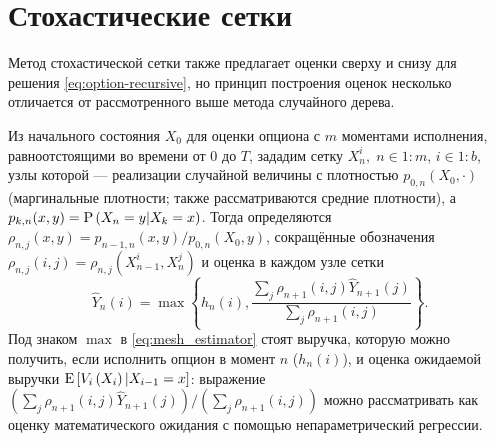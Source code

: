 



\section{Стохастические сетки} %
\label{sec:classic_approaches:mesh_estimator}

Метод стохастической сетки \cite{Broadie2004,Kashtanov2015} также предлагает оценки сверху и снизу для решения \eqref{eq:option-recursive}, но принцип построения оценок несколько отличается от рассмотренного выше метода случайного дерева.

Из начального состояния $X_0$ для оценки опциона с $m$ моментами исполнения, равноотстоящими во времени от 0 до $T$, зададим сетку $X_n^i,\; n\in 1\mathbin{:}m,\, i \in 1\mathbin{:}b$, узлы которой --- реализации случайной величины с плотностью $p_{0, n}(X_0, \cdot)$ (маргинальные плотности; также рассматриваются средние плотности), а $p_{k, n}(x, y) = \mathrm{P}\left(X_n = y \middle\vert X_k = x\right)$. Тогда определяются $\rho_{n, j}(x, y) = p_{n-1, n}(x, y) / p_{0, n}(X_0, y)$, сокращённые обозначения $\rho_{n, j}(i, j) = \rho_{n, j}(X_{n-1}^i, X_n^j)$ и оценка в каждом узле сетки
\begin{equation}\label{eq:mesh_estimator}
\hat Y_n(i) = \max\left\lbrace h_n(i), \frac{\sum_j \rho_{n+1}(i, j) \hat Y_{n+1}(j)}{\sum_j \rho_{n+1}(i, j)} \right\rbrace.
\end{equation}
Под знаком $\max$ в \eqref{eq:mesh_estimator} стоят выручка, которую можно получить, если исполнить опцион в момент $n$ ($h_n(i)$), и оценка ожидаемой выручки $\mathrm{E}\left[V_i\left(X_i\right)|X_{i-1}=x\right]$: выражение $\left(\sum_j \rho_{n+1}(i, j) \hat Y_{n+1}(j)\right) / \left(\sum_j \rho_{n+1}(i, j)\right)$ можно рассматривать как оценку математического ожидания с помощью непараметрический регрессии.

